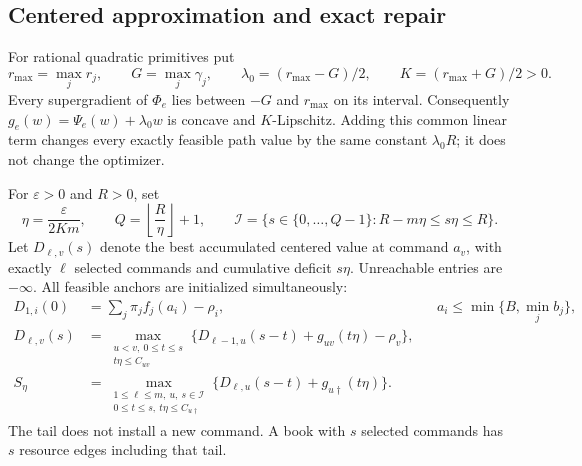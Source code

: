 \subsection{Centered approximation and exact repair}
For rational quadratic primitives put
\[
 r_{\max}=\max_jr_j,\qquad G=\max_j\gamma_j,
 \qquad \lambda_0=(r_{\max}-G)/2,\qquad K=(r_{\max}+G)/2>0.
\]
Every supergradient of $\Phi_e$ lies between $-G$ and $r_{\max}$ on its interval. Consequently
$g_e(w)=\Psi_e(w)+\lambda_0w$ is concave and $K$-Lipschitz. Adding this common linear term changes every exactly feasible path value by the same constant $\lambda_0R$; it does not change the optimizer.

For $\varepsilon>0$ and $R>0$, set
\begin{equation}\label{eq:mesh56}
 \eta=\frac{\varepsilon}{2Km},\qquad
 Q=\left\lfloor\frac{R}{\eta}\right\rfloor+1,\qquad
 \mathcal I=\{s\in\{0,\ldots,Q-1\}:R-m\eta\leq s\eta\leq R\}.
\end{equation}
Let $D_{\ell,v}(s)$ denote the best accumulated centered value at command $a_v$, with exactly $\ell$ selected commands and cumulative deficit $s\eta$. Unreachable entries are $-\infty$. All feasible anchors are initialized simultaneously:
\begin{align}
 D_{1,i}(0)&=\sum_j\pi_jf_j(a_i)-\rho_i,
       &&a_i\leq\min\{B,\min_jb_j\},\label{eq:init56}\\
 D_{\ell,v}(s)&=\max_{\substack{u<v,\ 0\leq t\leq s\\t\eta\leq C_{uv}}}
 \{D_{\ell-1,u}(s-t)+g_{uv}(t\eta)-\rho_v\},\label{eq:DP56}\\
 S_\eta&=\max_{\substack{1\leq\ell\leq m,\ u,\ s\in\mathcal I\\0\leq t\leq s,\ t\eta\leq C_{u\dagger}}}
 \{D_{\ell,u}(s-t)+g_{u\dagger}(t\eta)\}.\label{eq:terminal56}
\end{align}
The tail does not install a new command. A book with $s$ selected commands has $s$ resource edges including that tail.

